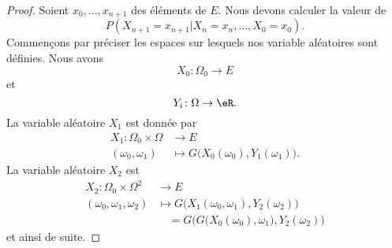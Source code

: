 \begin{proof}
	Soient \( x_0,\ldots, x_{n+1}\) des éléments de \( E\). Nous devons calculer la valeur de
	\begin{equation}
		P(X_{n+1}=x_{n+1}|X_n=x_n,\ldots, X_0=x_0).
	\end{equation}
	Commençons par préciser les espaces sur lesquels nos variable aléatoires sont définies. Nous avons
	\begin{equation}
		X_0\colon \Omega_0\to E
	\end{equation}
	et
	\begin{equation}
		Y_i\colon \Omega\to \eR.
	\end{equation}
	La variable aléatoire \( X_1\) est donnée par
	\begin{equation}
		\begin{aligned}
			X_1\colon \Omega_0\times \Omega & \to E                                             \\
			(\omega_0,\omega_1)             & \mapsto G\big( X_0(\omega_0),Y_1(\omega_1) \big).
		\end{aligned}
	\end{equation}
	La variable aléatoire \( X_2\) est
	\begin{equation}
		\begin{aligned}
			X_2\colon \Omega_0\times \Omega^2 & \to E                                                                \\
			(\omega_0,\omega_1,\omega_2)      & \mapsto G\big( X_1(\omega_0,\omega_1),Y_2(\omega_2) \big)            \\
			                                  & \quad=G\Big( G\big( X_0(\omega_0),\omega_1 \big),Y_2(\omega_2) \Big)
		\end{aligned}
	\end{equation}
	et ainsi de suite.


\end{proof}

